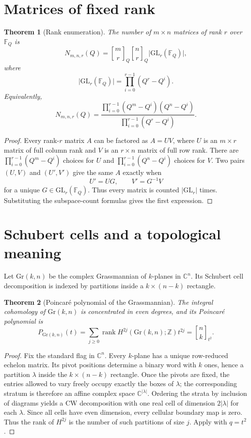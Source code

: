 \documentclass[11pt,oneside,openany]{book}
\newtheorem{theorem}{Theorem}[chapter]
\theoremstyle{definition}
\theoremstyle{remark}
\newcommand{\Qbinom}[3]{\genfrac{[}{]}{0pt}{}{#1}{#2}_{#3}}
\newcommand{\C}{\mathbb C}
\newcommand{\Z}{\mathbb Z}
\newcommand{\F}{\mathbb F}
\newcommand{\abs}[1]{\lvert #1\rvert}
\begin{document}
\section{Matrices of fixed rank}

\begin{theorem}[Rank enumeration]\label{thm:rank-matrices}
The number of $m\times n$ matrices of rank $r$ over $\F_Q$ is
\[
 N_{m,n,r}(Q)
 =\Qbinom mrQ\Qbinom nrQ\abs{\mathrm{GL}_r(\F_Q)},
\]
where
\[
 \abs{\mathrm{GL}_r(\F_Q)}=\prod_{i=0}^{r-1}(Q^r-Q^i).
\]
Equivalently,
\[
 N_{m,n,r}(Q)
 =\frac{\prod_{i=0}^{r-1}(Q^m-Q^i)(Q^n-Q^i)}
 {\prod_{i=0}^{r-1}(Q^r-Q^i)}.
\]
\end{theorem}

\begin{proof}
Every rank-$r$ matrix $A$ can be factored as $A=UV$, where $U$ is an $m\times r$ matrix of full column rank and $V$ is an $r\times n$ matrix of full row rank.  There are
\(
 \prod_{i=0}^{r-1}(Q^m-Q^i)
\)
choices for $U$ and
\(
 \prod_{i=0}^{r-1}(Q^n-Q^i)
\)
choices for $V$.  Two pairs $(U,V)$ and $(U',V')$ give the same $A$ exactly when
\[
 U'=UG,\qquad V'=G^{-1}V
\]
for a unique $G\in\mathrm{GL}_r(\F_Q)$.  Thus every matrix is counted $\abs{\mathrm{GL}_r}$ times.  Substituting the subspace-count formulas gives the first expression.
\end{proof}

\section{Schubert cells and a topological meaning}

Let $\mathrm{Gr}(k,n)$ be the complex Grassmannian of $k$-planes in $\C^n$.  Its Schubert cell decomposition is indexed by partitions inside a $k\times(n-k)$ rectangle.

\begin{theorem}[Poincar\'e polynomial of the Grassmannian]\label{thm:grassmann-poincare}
The integral cohomology of $\mathrm{Gr}(k,n)$ is concentrated in even degrees, and its Poincar\'e polynomial is
\[
 P_{\mathrm{Gr}(k,n)}(t)
 =\sum_{j\ge0}\operatorname{rank}H^{2j}(\mathrm{Gr}(k,n);\Z)t^{2j}
 =\Qbinom nk{t^2}.
\]
\end{theorem}

\begin{proof}
Fix the standard flag in $\C^n$.  Every $k$-plane has a unique row-reduced echelon matrix.  Its pivot positions determine a binary word with $k$ ones, hence a partition $\lambda$ inside the $k\times(n-k)$ rectangle.  Once the pivots are fixed, the entries allowed to vary freely occupy exactly the boxes of $\lambda$; the corresponding stratum is therefore an affine complex space $\C^{\abs\lambda}$.  Ordering the strata by inclusion of diagrams yields a CW decomposition with one real cell of dimension $2\abs\lambda$ for each $\lambda$.  Since all cells have even dimension, every cellular boundary map is zero.  Thus the rank of $H^{2j}$ is the number of such partitions of size $j$.  Apply  with $q=t^2$.
\end{proof}
\end{document}
